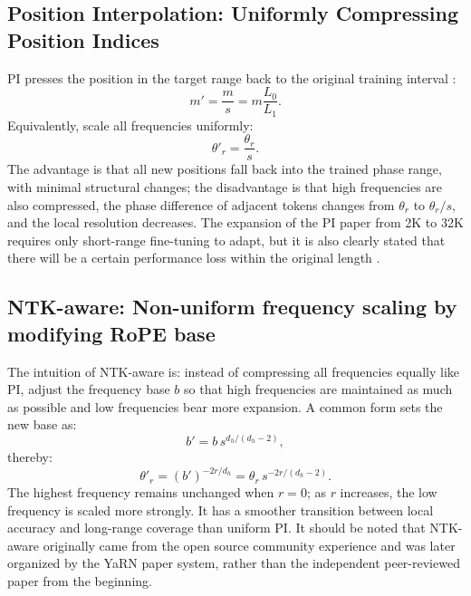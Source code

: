 \documentclass[UTF8,fontset=none,a4paper,10pt]{ctexart}
\begin{document}
\subsection{Position Interpolation: Uniformly Compressing Position Indices}

PI presses the position in the target range back to the original training interval \cite{en:chen2023pi}:
\begin{equation}
  m'=\frac{m}{s}=m\frac{L_0}{L_1}.
  \label{en:eq:pi-position}
\end{equation}
Equivalently, scale all frequencies uniformly:
\begin{equation}
  \theta'_r=\frac{\theta_r}{s}.
  \label{en:eq:pi-frequency}
\end{equation}
The advantage is that all new positions fall back into the trained phase range, with minimal structural changes; the disadvantage is that high frequencies are also compressed, the phase difference of adjacent tokens changes from $\theta_r$ to $\theta_r/s$, and the local resolution decreases. The expansion of the PI paper from 2K to 32K requires only short-range fine-tuning to adapt, but it is also clearly stated that there will be a certain performance loss within the original length \cite{en:chen2023pi}.

\subsection{NTK-aware: Non-uniform frequency scaling by modifying RoPE base}

The intuition of NTK-aware is: instead of compressing all frequencies equally like PI, adjust the frequency base $b$ so that high frequencies are maintained as much as possible and low frequencies bear more expansion. A common form sets the new base as:
\begin{equation}
  b'=b\,s^{d_h/(d_h-2)},
  \label{en:eq:ntk-base}
\end{equation}
thereby:
\begin{equation}
  \theta'_r=(b')^{-2r/d_h}
  =\theta_r\,s^{-2r/(d_h-2)}.
  \label{en:eq:ntk-frequency}
\end{equation}
The highest frequency remains unchanged when $r=0$; as $r$ increases, the low frequency is scaled more strongly. It has a smoother transition between local accuracy and long-range coverage than uniform PI. It should be noted that NTK-aware originally came from the open source community experience and was later organized by the YaRN paper system, rather than the independent peer-reviewed paper \cite{en:peng2024yarn} from the beginning.
\end{document}
